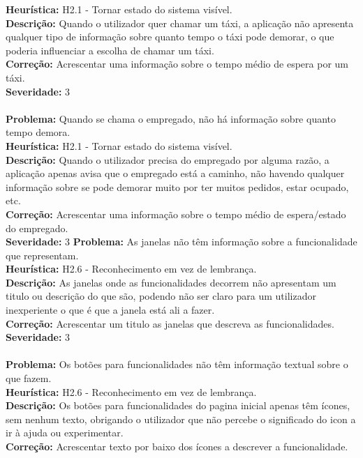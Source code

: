 \documentclass{article}
\begin{document}
\textbf{Heurística:} H2.1 - Tornar estado do sistema visível.\\
\textbf{Descrição:} Quando o utilizador quer chamar um táxi, a aplicação não apresenta qualquer tipo de informação sobre quanto tempo o táxi pode demorar, o que poderia influenciar a escolha de chamar um táxi.\\
\textbf{Correção:} Acrescentar uma informação sobre o tempo médio de espera por um táxi.\\
\textbf{Severidade:} 3\\
\\
\textbf{Problema:} Quando se chama o empregado, não há informação sobre quanto tempo demora.\\
\textbf{Heurística:} H2.1 - Tornar estado do sistema visível.\\
\textbf{Descrição:} Quando o utilizador precisa do empregado por alguma razão, a aplicação apenas avisa que o empregado está a caminho, não havendo qualquer informação sobre se pode demorar muito por ter muitos pedidos, estar ocupado, etc.\\
\textbf{Correção:} Acrescentar uma informação sobre o tempo médio de espera/estado do empregado.\\
\textbf{Severidade:} 3
\clearpage
\noindent\textbf{Problema:} As janelas não têm informação sobre a funcionalidade que representam.\\
\textbf{Heurística:} H2.6 - Reconhecimento em vez de lembrança.\\
\textbf{Descrição:} As janelas onde as funcionalidades decorrem não apresentam um titulo ou descrição do que são, podendo não ser claro para um utilizador inexperiente o que é que a janela está ali a fazer.\\
\textbf{Correção:} Acrescentar um titulo as janelas que descreva as funcionalidades.\\
\textbf{Severidade:} 3\\
\\
\textbf{Problema:} Os botões para funcionalidades não têm informação textual sobre o que fazem.\\
\textbf{Heurística:} H2.6 - Reconhecimento em vez de lembrança.\\
\textbf{Descrição:} Os botões para funcionalidades do pagina inicial apenas têm ícones, sem nenhum texto, obrigando o utilizador que não percebe o significado do icon a ir à ajuda ou experimentar.\\
\textbf{Correção:} Acrescentar texto por baixo dos ícones a descrever a funcionalidade.\\
\end{document}
